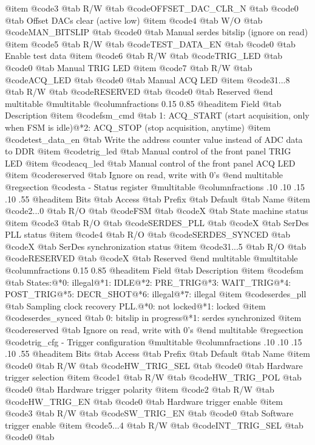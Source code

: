 @item @code{3}
@tab R/W @tab
@code{OFFSET_DAC_CLR_N}
@tab @code{0} @tab 
Offset DACs clear (active low)
@item @code{4}
@tab W/O @tab
@code{MAN_BITSLIP}
@tab @code{0} @tab 
Manual serdes bitslip (ignore on read)
@item @code{5}
@tab R/W @tab
@code{TEST_DATA_EN}
@tab @code{0} @tab 
Enable test data
@item @code{6}
@tab R/W @tab
@code{TRIG_LED}
@tab @code{0} @tab 
Manual TRIG LED
@item @code{7}
@tab R/W @tab
@code{ACQ_LED}
@tab @code{0} @tab 
Manual ACQ LED
@item @code{31...8}
@tab R/W @tab
@code{RESERVED}
@tab @code{0} @tab 
Reserved
@end multitable
@multitable @columnfractions 0.15 0.85
@headitem Field @tab Description
@item @code{fsm_cmd} @tab 1: ACQ_START (start acquisition, only when FSM is idle)@*2: ACQ_STOP (stop acquisition, anytime)
@item @code{test_data_en} @tab Write the address counter value instead of ADC data to DDR
@item @code{trig_led} @tab Manual control of the front panel TRIG LED
@item @code{acq_led} @tab Manual control of the front panel ACQ LED
@item @code{reserved} @tab Ignore on read, write with 0's
@end multitable
@regsection @code{sta} - Status register
@multitable @columnfractions .10 .10 .15 .10 .55
@headitem Bits @tab Access @tab Prefix @tab Default @tab Name
@item @code{2...0}
@tab R/O @tab
@code{FSM}
@tab @code{X} @tab 
State machine status
@item @code{3}
@tab R/O @tab
@code{SERDES_PLL}
@tab @code{X} @tab 
SerDes PLL status
@item @code{4}
@tab R/O @tab
@code{SERDES_SYNCED}
@tab @code{X} @tab 
SerDes synchronization status
@item @code{31...5}
@tab R/O @tab
@code{RESERVED}
@tab @code{X} @tab 
Reserved
@end multitable
@multitable @columnfractions 0.15 0.85
@headitem Field @tab Description
@item @code{fsm} @tab States:@*0: illegal@*1: IDLE@*2: PRE_TRIG@*3: WAIT_TRIG@*4: POST_TRIG@*5: DECR_SHOT@*6: illegal@*7: illegal
@item @code{serdes_pll} @tab Sampling clock recovery PLL.@*0: not locked@*1: locked
@item @code{serdes_synced} @tab 0: bitslip in progress@*1: serdes synchronized
@item @code{reserved} @tab Ignore on read, write with 0's
@end multitable
@regsection @code{trig_cfg} - Trigger configuration
@multitable @columnfractions .10 .10 .15 .10 .55
@headitem Bits @tab Access @tab Prefix @tab Default @tab Name
@item @code{0}
@tab R/W @tab
@code{HW_TRIG_SEL}
@tab @code{0} @tab 
Hardware trigger selection
@item @code{1}
@tab R/W @tab
@code{HW_TRIG_POL}
@tab @code{0} @tab 
Hardware trigger polarity
@item @code{2}
@tab R/W @tab
@code{HW_TRIG_EN}
@tab @code{0} @tab 
Hardware trigger enable
@item @code{3}
@tab R/W @tab
@code{SW_TRIG_EN}
@tab @code{0} @tab 
Software trigger enable
@item @code{5...4}
@tab R/W @tab
@code{INT_TRIG_SEL}
@tab @code{0} @tab 
